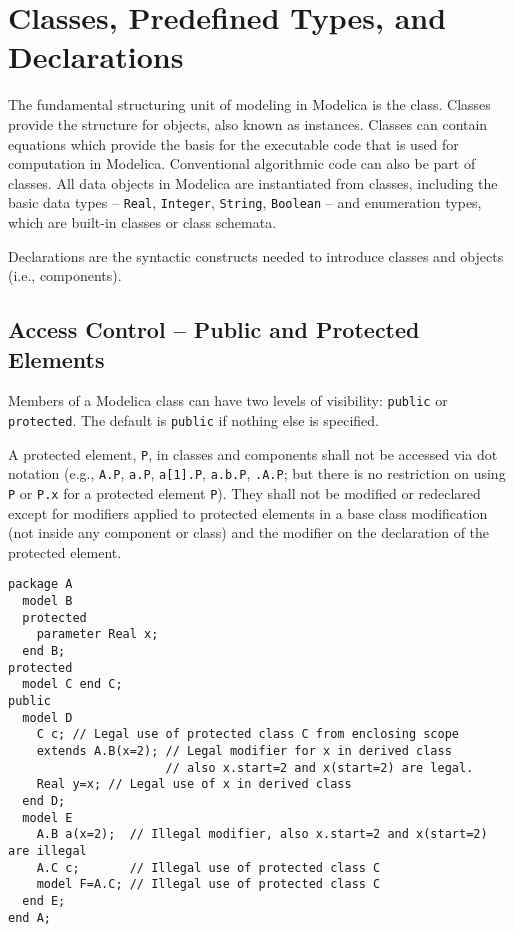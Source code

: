 \chapter{Classes, Predefined Types, and Declarations}\label{class-predefined-types-and-declarations}

The fundamental structuring unit of modeling in Modelica is the class.
Classes provide the structure for objects, also known as instances.
Classes can contain equations which provide the basis for the executable code that is used for computation in Modelica.
Conventional algorithmic code can also be part of classes.
All data objects in Modelica are instantiated from classes, including the basic data types -- \lstinline!Real!, \lstinline!Integer!, \lstinline!String!, \lstinline!Boolean! -- and enumeration types, which are built-in classes or class schemata.

Declarations are the syntactic constructs needed to introduce classes and objects (i.e., components).

\section{Access Control -- Public and Protected Elements}\label{access-control-public-and-protected-elements}

Members of a Modelica class can have two levels of visibility: \lstinline!public! or \lstinline!protected!.
The default is \lstinline!public! if nothing else is specified.

A protected element, \lstinline!P!, in classes and components shall not be accessed via dot notation (e.g., \lstinline!A.P!, \lstinline!a.P!, \lstinline!a[1].P!, \lstinline!a.b.P!, \lstinline!.A.P!; but there is no restriction on using \lstinline!P! or \lstinline!P.x! for a protected element \lstinline!P!).
They shall not be modified or redeclared except for modifiers applied to protected elements in a base class modification (not inside any component or class) and the modifier on the declaration of the protected element.

\begin{example}
\begin{lstlisting}[language=modelica]
package A
  model B
  protected
    parameter Real x;
  end B;
protected
  model C end C;
public
  model D
    C c; // Legal use of protected class C from enclosing scope
    extends A.B(x=2); // Legal modifier for x in derived class
                      // also x.start=2 and x(start=2) are legal.
    Real y=x; // Legal use of x in derived class
  end D;
  model E
    A.B a(x=2);  // Illegal modifier, also x.start=2 and x(start=2) are illegal
    A.C c;       // Illegal use of protected class C
    model F=A.C; // Illegal use of protected class C
  end E;
end A;
\end{lstlisting}
\end{example}

